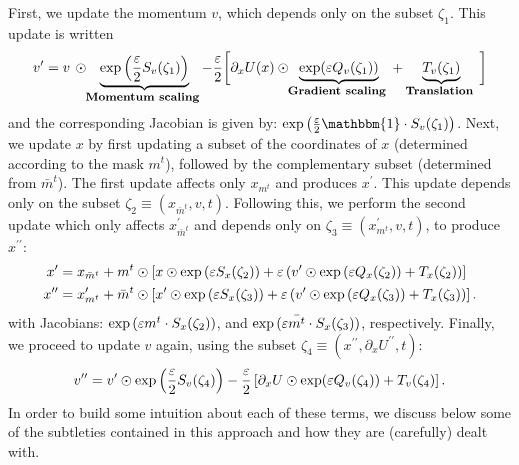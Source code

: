 \documentclass[../main.tex]{subfiles}
\begin{document}
First, we update the momentum $v$, which depends only on the subset $\zeta_1$.
%
This update is written
%
\begin{equation}
  \vp = v\, \odot%
      \hspace{-1mm}%
      \underbrace{\exp\left(\frac{\varepsilon}{2}
      S_{v}(\zeta_1)\right)}_{\text{%
        \footnotesize{\textbf{Momentum scaling}\normalsize}
      }}%
        \hspace{-1mm}%
      - \frac{\varepsilon}{2}\bigg[%
          \partial_{x} U(x)%
          \odot\hspace{-1mm}\underbrace{\exp(\varepsilon
          Q_{v}(\zeta_1))}_{\text{%
            \footnotesize{\textbf{Gradient scaling}\normalsize}
          }}
        + \underbrace{T_v(\zeta_1)}_{\text{%
            \footnotesize{\textbf{Translation}\normalsize}
          }}
      \bigg]
    \label{eq:update_momentum_forward1}
\end{equation}
%
and the corresponding Jacobian is given by:
$\exp{\left(\frac{\eps}{2}\mathbbm{1} \cdot S_{v}(\zeta_1)\right)}$.
%
Next, we update $x$ by first updating a subset of the coordinates of $x$
(determined according to the mask $m^t$), followed by the complementary subset
(determined from $\bar m^{t}$).
%
The first update affects only $x_{m^{t}}$ and produces $x^{\prime}$.
%
This update depends only on the subset $\zeta_2 \equiv (x_{\bar m^t}, v, t)$.
%
Following this, we perform the second update which only affects
$x_{\bar{m}^t}^{\prime}$ and depends only on $\zeta_3 \equiv (x_{m^t}^{\prime},
v, t)$, to produce $x^{\prime\prime}$:
%
\begin{align}
  x^{\prime} &= x_{\bar{m}^t} + m^{t}\odot\left[x \odot \exp{(\eps
      S_x(\zeta_2))} + \eps\left(v^{\prime}\odot%
    \exp{(\eps Q_x(\zeta_2))} + T_x(\zeta_2)\right)\right]\\
  x^{\prime\prime} &= x^{\prime}_{m^t} + \bar m^t \odot \left[x^{\prime} \odot
    \exp{(\eps S_x(\zeta_3))} +%
    \eps\left(v^{\prime} \odot \exp{(\eps Q_x(\zeta_3))} +
  T_x(\zeta_3)\right)\right].
\end{align}
%
with Jacobians: $\exp{({\varepsilon}m^{t} \cdot S_x(\zeta_2))}$, and
$\exp{({\varepsilon}\bar{m^t}\cdot S_x(\zeta_3))}$, respectively. 
%
Finally, we proceed to update $v$ again, using the subset $\zeta_4 \equiv
(x^{\prime\prime}, \partial_{x} U^{\prime\prime}, t)$: 
%
\begin{equation} 
  {v^{\prime\prime}} = {v^{\prime}} \odot \exp\left(\frac{\varepsilon}{2} S_v(\zeta_4)\right) -
    \frac{\varepsilon}{2}\left[\partial_{x} U
  \odot \exp(\varepsilon Q_v(\zeta_4)) + T_v(\zeta_4)\right].
    \label{eq:update_momentum_forward2}
\end{equation}
%
In order to build some intuition about each of these terms, we discuss below
some of the subtleties contained in this approach and how they are (carefully)
dealt with.
\end{document}
